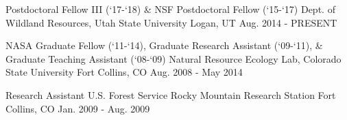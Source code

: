 

\begin{cventries}

  \eduentry
    {Postdoctoral Fellow III (`17-`18) \& NSF Postdoctoral Fellow (`15-`17)} %
    {Dept. of Wildland Resources, Utah State University} %
    {Logan, UT} %
    {Aug. 2014 - PRESENT} %

  \eduentry
    {NASA Graduate Fellow (`11-`14), Graduate Research Assistant (`09-`11), \& Graduate Teaching Assistant (`08-`09)} %
    {Natural Resource Ecology Lab, Colorado State University} %
    {Fort Collins, CO} %
    {Aug. 2008 - May 2014} %

  \eduentry
    {Research Assistant} %
    {U.S. Forest Service Rocky Mountain Research Station} %
    {Fort Collins, CO} %
    {Jan. 2009 - Aug. 2009} %

\end{cventries}
